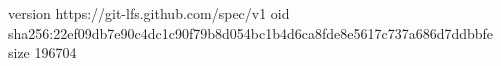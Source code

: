 version https://git-lfs.github.com/spec/v1
oid sha256:22ef09db7e90c4dc1c90f79b8d054bc1b4d6ca8fde8e5617c737a686d7ddbbfe
size 196704
